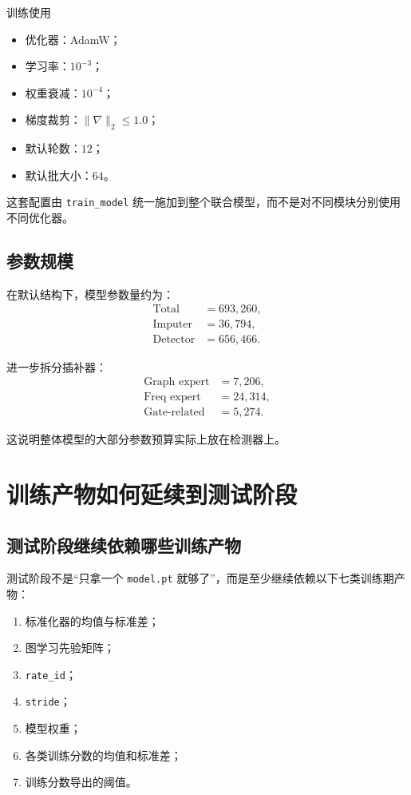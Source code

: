 \documentclass[UTF8]{ctexart}
\newcommand{\code}[1]{\texttt{#1}}
\begin{document}
训练使用
\begin{itemize}
    \item 优化器：AdamW；
    \item 学习率：\(10^{-3}\)；
    \item 权重衰减：\(10^{-4}\)；
    \item 梯度裁剪：\(\|\nabla\|_2 \le 1.0\)；
    \item 默认轮数：\(12\)；
    \item 默认批大小：\(64\)。
\end{itemize}

这套配置由 \code{train\_model} 统一施加到整个联合模型，而不是对不同模块分别使用不同优化器。

\subsection{参数规模}

在默认结构下，模型参数量约为：
\begin{align}
    \text{Total} &= 693{,}260, \\
    \text{Imputer} &= 36{,}794, \\
    \text{Detector} &= 656{,}466.
\end{align}

进一步拆分插补器：
\begin{align}
    \text{Graph expert} &= 7{,}206, \\
    \text{Freq expert} &= 24{,}314, \\
    \text{Gate-related} &= 5{,}274.
\end{align}

这说明整体模型的大部分参数预算实际上放在检测器上。

\section{训练产物如何延续到测试阶段}

\subsection{测试阶段继续依赖哪些训练产物}

测试阶段不是“只拿一个 \code{model.pt} 就够了”，而是至少继续依赖以下七类训练期产物：
\begin{enumerate}
    \item 标准化器的均值与标准差；
    \item 图学习先验矩阵；
    \item \code{rate\_id}；
    \item \code{stride}；
    \item 模型权重；
    \item 各类训练分数的均值和标准差；
    \item 训练分数导出的阈值。
\end{enumerate}
\end{document}
